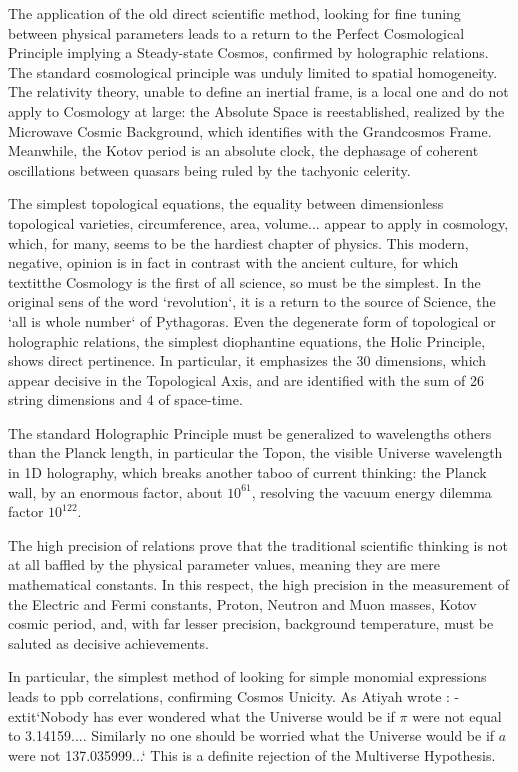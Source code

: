 \documentclass[twoside,draft]{article}
\begin{document}
\begin{sloppypar}
The application of the old direct scientific method, looking for fine tuning between physical
parameters leads to a return to the Perfect Cosmological Principle implying a Steady-state Cosmos,
confirmed by holographic relations. The standard cosmological principle was unduly limited to
spatial homogeneity. The relativity theory, unable to define an inertial frame, is a local one and do
not apply to Cosmology at large: the Absolute Space is reestablished, realized by the Microwave
Cosmic Background, which identifies with the Grandcosmos Frame. Meanwhile, the Kotov period is an
absolute clock, the dephasage of coherent oscillations between quasars being ruled by the tachyonic celerity.

The simplest topological equations, the equality between dimensionless topological varieties,
circumference, area, volume... appear to apply in cosmology, which, for many, seems to be the hardiest
chapter of physics. This modern, negative, opinion is in fact in contrast with the ancient culture, for
which textit{the Cosmology is the first of all science, so must be the simplest}. In the original sens of the
word `revolution`, it is a return to the source of Science, the `all is whole number` of Pythagoras.
Even the degenerate form of topological or holographic relations, the simplest diophantine
equations, the Holic Principle, shows direct pertinence. In particular, it emphasizes the 30
dimensions, which appear decisive in the Topological Axis, and are identified with the sum of 26 string
dimensions and 4 of space-time.

The standard Holographic Principle must be generalized to wavelengths others than the Planck
length, in particular the Topon, the visible Universe wavelength in 1D holography, which breaks
another taboo of current thinking: the Planck wall, by an enormous factor, about $10^{61}$, resolving the
vacuum energy dilemma factor $10^{122}$.

The high precision of relations prove that the traditional scientific thinking is not at all baffled by
the physical parameter values, meaning they are mere mathematical constants. In this respect, the
high precision in the measurement of the Electric and Fermi constants, Proton, Neutron and Muon masses, Kotov cosmic period, and, with far lesser precision, background temperature, must be saluted as decisive achievements.

In particular, the simplest method of looking for simple monomial expressions leads to ppb correlations, confirming Cosmos Unicity. As Atiyah wrote \cite{Atiyah1}: -extit{`Nobody has
ever wondered what the Universe would be if $\pi$ were not equal to 3.14159.... Similarly no one
should be worried what the Universe would be if $a$ were not 137.035999...}` This is a definite
rejection of the Multiverse Hypothesis.


\end{sloppypar}
\end{document}
